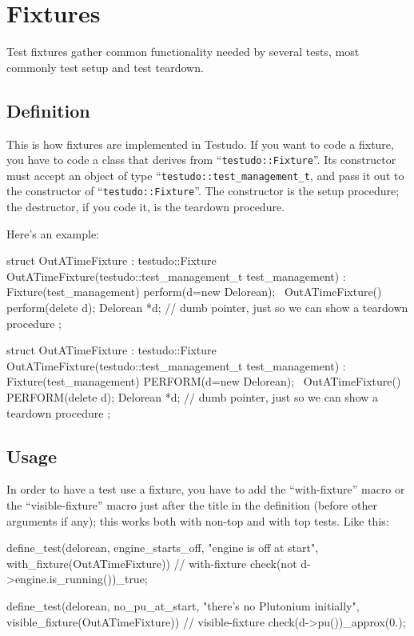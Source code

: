 \documentclass[twoside, a4paper, article]{memoir}
\begin{document}
\chapter{Fixtures}
\label{cha:fixtures}

Test fixtures gather common functionality needed by several tests, most
commonly test setup and test teardown.

\section{Definition}
\label{sec:fixture-definition}

This is how fixtures are implemented in Testudo.  If you want to code a
fixture, you have to code a class that derives from
``\texttt{testudo::Fixture}''.  Its constructor must accept an object of type
``\texttt{testudo::test\_management\_t}, and pass it out to the constructor of
``\texttt{testudo::Fixture}''.  The constructor is the setup procedure; the
destructor, if you code it, is the teardown procedure.

Here's an example:
\begin{cpplisting}
struct OutATimeFixture : testudo::Fixture {
  OutATimeFixture(testudo::test_management_t test_management)
    : Fixture(test_management)
    { perform(d=new Delorean); }
  ~OutATimeFixture()
    { perform(delete d); }
  Delorean *d; // dumb pointer, just so we can show a teardown procedure
};
\end{cpplisting}

\begin{cpplisting}
struct OutATimeFixture : testudo::Fixture
{
  OutATimeFixture(testudo::test_management_t test_management)
    : Fixture(test_management)
  {
    PERFORM(d=new Delorean);
  }
  ~OutATimeFixture()
  {
    PERFORM(delete d);
  }
  Delorean *d; // dumb pointer, just so we can show a teardown procedure
};
\end{cpplisting}

\section{Usage}
\label{sec:fixture-usage}

In order to have a test use a fixture, you have to add the ``with-fixture''
macro or the ``visible-fixture'' macro just after the title in the definition
(before other arguments if any); this works both with non-top and with top
tests.  Like this:
\begin{cpplisting}
define_test(delorean,
            engine_starts_off, "engine is off at start",
            with_fixture(OutATimeFixture)) // with-fixture
{
  check(not d->engine.is_running())_true;
}

define_test(delorean,
            no_pu_at_start, "there's no Plutonium initially",
            visible_fixture(OutATimeFixture)) // visible-fixture
{
  check(d->pu())_approx(0.);
}
\end{cpplisting}
\end{document}
